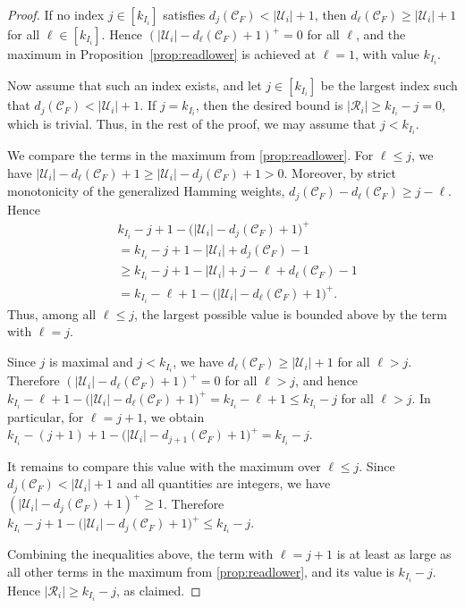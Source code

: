 \documentclass[10pt,a4paper]{amsart}
\newcommand{\mC}{\mathcal{C}}
\newcommand{\mR}{\mathcal{R}}
\newcommand{\mU}{\mathcal{U}}
\begin{document}
\begin{proof}
If no index $j\in[k_{I_i}]$ satisfies $d_j(\mC_F)<|\mU_i|+1$, then
$d_\ell(\mC_F)\ge |\mU_i|+1$ for all $\ell\in[k_{I_i}]$. Hence $(|\mU_i|-d_\ell(\mC_F)+1)^+=0$ for all $\ell$, and the maximum in Proposition~\ref{prop:readlower} is achieved at $\ell=1$, with value $k_{I_i}$. 

Now assume that such an index exists, and let $j\in[k_{I_i}]$ be the largest index such that
$d_j(\mC_F)<|\mU_i|+1$. If $j=k_{I_i}$, then the desired bound is
$|\mR_i|\ge k_{I_i}-j=0$, which is trivial. Thus, in the rest of the proof,
we may assume that $j<k_{I_i}$.

We compare the terms in the maximum from \cref{prop:readlower}.
For $\ell\le j$, we have
$|\mU_i|-d_\ell(\mC_F)+1\ge |\mU_i|-d_j(\mC_F)+1>0$. Moreover, by strict
monotonicity of the generalized Hamming weights,
$d_j(\mC_F)-d_\ell(\mC_F)\ge j-\ell$. Hence
\begin{align*}
&k_{I_i}-j+1-\bigl(|\mU_i|-d_j(\mC_F)+1\bigr)^+\\
&=
k_{I_i}-j+1-|\mU_i|+d_j(\mC_F)-1 \\
&\ge
k_{I_i}-j+1-|\mU_i|+j-\ell+d_\ell(\mC_F)-1 \\
&=
k_{I_i}-\ell+1-\bigl(|\mU_i|-d_\ell(\mC_F)+1\bigr)^+ .
\end{align*}
Thus, among all $\ell\le j$, the largest possible value is bounded above by the term with $\ell=j$.

Since $j$ is maximal and $j<k_{I_i}$, we have
$d_\ell(\mC_F)\ge |\mU_i|+1$ for all $\ell>j$. Therefore
$(|\mU_i|-d_\ell(\mC_F)+1)^+=0$ for all $\ell>j$, and hence $k_{I_i}-\ell+1-\bigl(|\mU_i|-d_\ell(\mC_F)+1\bigr)^+
=
k_{I_i}-\ell+1
\le
k_{I_i}-j$ for all $\ell>j$. In particular, for $\ell=j+1$, we obtain $k_{I_i}-(j+1)+1-\bigl(|\mU_i|-d_{j+1}(\mC_F)+1\bigr)^+
=
k_{I_i}-j$.

It remains to compare this value with the maximum over $\ell\le j$. Since
$d_j(\mC_F)<|\mU_i|+1$ and all quantities are integers, we have
$(|\mU_i|-d_j(\mC_F)+1)^+\ge 1$. Therefore $k_{I_i}-j+1-\bigl(|\mU_i|-d_j(\mC_F)+1\bigr)^+
\le
k_{I_i}-j$.

Combining the inequalities above, the term with $\ell=j+1$ is at least as large as all other terms in the maximum from \cref{prop:readlower}, and its value is $k_{I_i}-j$. Hence
$|\mR_i|\ge k_{I_i}-j$, as claimed.
    \end{proof}
\end{document}
